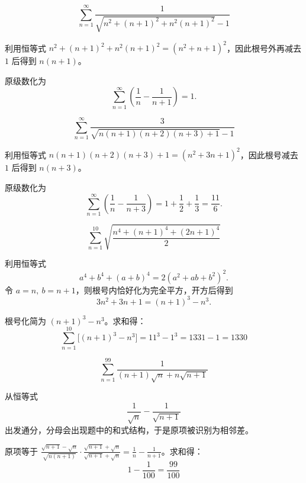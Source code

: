 \begin{example}
    $$ \sum_{n=1}^{\infty} \frac{1}{\sqrt{n^2 + (n+1)^2 + n^2(n+1)^2} - 1} $$
\end{example}
\begin{solution}
利用恒等式 \(n^2+(n+1)^2+n^2(n+1)^2=(n^2+n+1)^2\)，因此根号外再减去 \(1\) 后得到 \(n(n+1)\)。

原级数化为
\[
\sum_{n=1}^{\infty}\left(\frac{1}{n}-\frac{1}{n+1}\right)=1.
\]
\end{solution}

\begin{example}
    $$ \sum_{n=1}^{\infty} \frac{3}{\sqrt{n(n+1)(n+2)(n+3) + 1} - 1} $$
\end{example}
\begin{solution}
利用恒等式 \(n(n+1)(n+2)(n+3)+1=(n^2+3n+1)^2\)，因此根号减去 \(1\) 后得到 \(n(n+3)\)。

原级数化为
\[
\sum_{n=1}^{\infty} \left(\frac{1}{n}-\frac{1}{n+3}\right)
=1+\frac12+\frac13
=\frac{11}{6}.
\]
\end{solution}


\begin{example}[$\displaystyle \sum_{n=1}^{10} \sqrt{\frac{n^4 + (n+1)^4 + (2n+1)^4}{2}}$]
    $$\displaystyle \sum_{n=1}^{10} \sqrt{\frac{n^4 + (n+1)^4 + (2n+1)^4}{2}}$$
\end{example}
\begin{solution}
利用恒等式
\[
a^4+b^4+(a+b)^4=2(a^2+ab+b^2)^2.
\]
令 \(a=n,\ b=n+1\)，则根号内恰好化为完全平方，开方后得到
\[
3n^2+3n+1=(n+1)^3-n^3.
\]

根号化简为 \((n+1)^3 - n^3\)。求和得：
\[
\sum_{n=1}^{10} \bigl[(n+1)^3 - n^3\bigr] = 11^3 - 1^3 = 1331 - 1 = 1330
\]

\end{solution}

\begin{example}[$\displaystyle \sum_{n=1}^{99} \frac{1}{(n+1)\sqrt{n} + n\sqrt{n+1}}$]
    \[\displaystyle \sum_{n=1}^{99} \frac{1}{(n+1)\sqrt{n} + n\sqrt{n+1}}\]
\end{example}
\begin{solution}
从恒等式
\[
\frac{1}{\sqrt{n}}-\frac{1}{\sqrt{n+1}}
\]
出发通分，分母会出现题中的和式结构，于是原项被识别为相邻差。

原项等于 \(\frac{\sqrt{n+1} - \sqrt{n}}{\sqrt{n(n+1)}} \cdot \frac{\sqrt{n+1} + \sqrt{n}}{\sqrt{n+1} + \sqrt{n}} = \frac{1}{n} - \frac{1}{n+1}\)。求和得：
\[
1 - \frac{1}{100} = \frac{99}{100}
\]

\end{solution}

